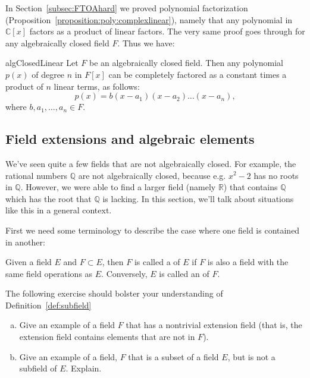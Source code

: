 In Section~\ref{subsec:FTOAhard} we proved polynomial factorization (Proposition~\ref{proposition:poly:complexlinear}), namely that any polynomial in $\mathbb{C}[x]$ factors as a product of linear factors. The very same proof goes through for any algebraically closed field $F$.  Thus we have:

\begin{prop}{algClosedLinear}
Let $F$ be an algebraically closed field. Then any polynomial $p(x)$  of degree $n$ in $F[x]$ can be completely factored as a constant times a product of $n$ linear terms,   as follows:
\begin{equation}
p(x) = b(x -a_1)(x-a_2) \ldots (x - a_n),
\end{equation}
where $b,a_1,\ldots,a_n \in F$.
\end{prop}



\subsection{Field extensions and algebraic elements}
We've seen quite a few fields that are not algebraically closed. For example, the rational numbers $\mathbb{Q}$ are not algebraically closed, because e.g. $x^2 - 2$ has no  roots in $\mathbb{Q}$.  However, we were able to find a larger field (namely $\mathbb{R}$) that contains $\mathbb{Q}$ which has the root that $\mathbb{Q}$ is lacking. In this section, we'll talk about situations like this in a general context. 


First we need some  terminology to describe the case where one field is contained in  another:


\begin{defn}\label{def:subfield}  
Given a field $E$ and $F\subset E$, then $F$ is called a  of $E$ if $F$ is also a field with the same field operations as $E$. Conversely, $E$ is called an  of $F$.
 \end{defn}

The following exercise should  bolster your understanding of Definition~\ref{def:subfield}

\begin{exercise}{}
\begin{enumerate}[(a)]
\item
Give an example of a field $F$ that has a nontrivial extension field (that is, the extension field contains elements that are not in $F$).
\item
Give an example of a field, $F$ that is a subset of a field $E$, but is not a subfield of $E$. Explain.
\end{enumerate}
\end{exercise}

